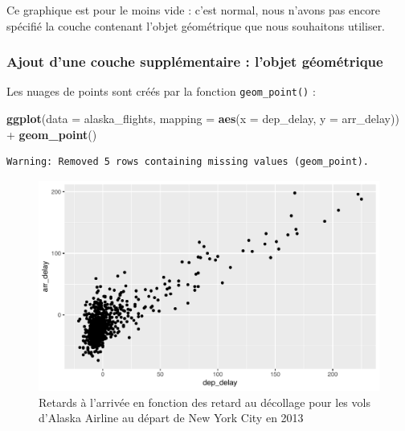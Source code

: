 \documentclass[a4paperpaper,]{article}
\newenvironment{Shaded}{\begin{snugshade}}{\end{snugshade}}
\newcommand{\DataTypeTok}[1]{\textcolor[rgb]{0.00,0.34,0.68}{#1}}
\newcommand{\KeywordTok}[1]{\textcolor[rgb]{0.12,0.11,0.11}{\textbf{#1}}}
\newcommand{\NormalTok}[1]{\textcolor[rgb]{0.12,0.11,0.11}{#1}}
\newcommand{\OperatorTok}[1]{\textcolor[rgb]{0.12,0.11,0.11}{#1}}
\newcommand{\StringTok}[1]{\textcolor[rgb]{0.75,0.01,0.01}{#1}}
\theoremstyle{definition}
\theoremstyle{definition}
\theoremstyle{definition}
\theoremstyle{remark}
\begin{document}
Ce graphique est pour le moins vide : c'est normal, nous n'avons pas
encore spécifié la couche contenant l'objet géométrique que nous
souhaitons utiliser.

\hypertarget{ajout-dune-couche-supplementaire-lobjet-geometrique}{%
\subsubsection{Ajout d'une couche supplémentaire : l'objet
géométrique}\label{ajout-dune-couche-supplementaire-lobjet-geometrique}}

Les nuages de points sont créés par la fonction \texttt{geom\_point()} :

\begin{Shaded}
\begin{Highlighting}[]
\KeywordTok{ggplot}\NormalTok{(}\DataTypeTok{data =}\NormalTok{ alaska_flights, }\DataTypeTok{mapping =} \KeywordTok{aes}\NormalTok{(}\DataTypeTok{x =}\NormalTok{ dep_delay, }\DataTypeTok{y =}\NormalTok{ arr_delay)) }\OperatorTok{+}\StringTok{ }
\StringTok{  }\KeywordTok{geom_point}\NormalTok{()}
\end{Highlighting}
\end{Shaded}

\begin{verbatim}
Warning: Removed 5 rows containing missing values (geom_point).
\end{verbatim}

\begin{figure}[htpb]

{\centering \includegraphics[width=0.9\linewidth]{figure/unnamed-chunk-38-1} 

}

\caption{Retards à l'arrivée en fonction des retard au décollage pour les vols d'Alaska Airline au départ de New York City en 2013}\label{fig:unnamed-chunk-38}
\end{figure}
\end{document}
